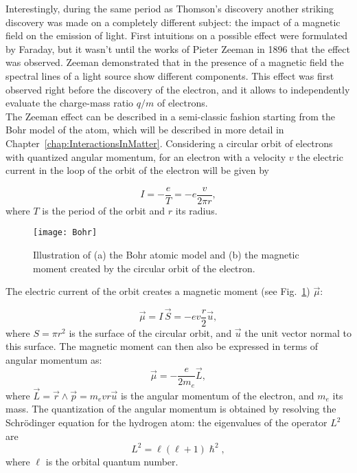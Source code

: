 Interestingly, during the same period as Thomson's discovery another striking discovery was made on a completely different subject: the impact of a magnetic field on the  emission of light. First intuitions on a possible effect were formulated by Faraday, but it wasn't until the works of Pieter Zeeman in 1896 that the effect was observed. Zeeman demonstrated that in the presence of a magnetic field the spectral lines of a light source show different components. This effect was first observed right before the discovery of the electron, and it allows to independently evaluate the charge-mass ratio $q/m$ of electrons. \\

The Zeeman effect can be described in a semi-classic fashion starting from the Bohr model of the atom, which will be described in more detail in Chapter~\ref{chap:InteractionsInMatter}. Considering a circular orbit of electrons with quantized angular momentum, for an electron with a velocity $v$ the electric current in the loop of the orbit of the electron will be given by

\begin{equation*} I = -\frac{e}{T}=-e \frac{v}{2 \pi r}, \end{equation*}
where $T$ is the period of the orbit and $r$ its radius.

\begin{figure}
  \centering
  \texttt{[image: Bohr]}
\caption{Illustration of (a) the Bohr atomic model and (b) the magnetic moment created by the circular orbit of the electron.}  \label{fig:Bohr}
\end{figure}{}
 

The electric current of the orbit creates a magnetic moment (see Fig.~\ref{fig:Bohr}) $\vec{\mu}$:

\begin{equation*} \vec{\mu} = I \, \vec{S} = -e v \frac{r}{2} \vec{u}, \end{equation*}
where $S=\pi r^2$ is the surface of the circular orbit, and $\vec{u}$ the unit vector normal to this surface. The magnetic moment can then also be expressed in terms of angular momentum as:
\begin{equation*} \vec{\mu} = -\frac{e}{2 m_e} \vec{L}, \end{equation*}
where $\vec{L} = \vec{r} \wedge \vec{p} = m_e vr \vec{u}$ is the  angular momentum of the electron, and $m_e$ its mass. The quantization of the angular momentum is obtained by resolving the Schr\"odinger equation for the hydrogen atom: the eigenvalues of the operator $L^2$ are
\begin{equation*}L^2 = \ell (\ell +1) \hslash^2,\end{equation*}
where $\ell$ is the orbital quantum number.

